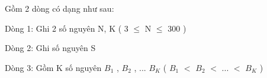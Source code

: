 Gồm 2 dòng có dạng như sau:

Dòng 1: Ghi 2 số nguyên N, K ( 3  $\le$  N  $\le$  300 )

Dòng 2: Ghi số nguyên S

Dòng 3: Gồm K số nguyên $B_{1}$ , $B_{2}$ , ... $B_{K}$ ( $B_{1}$ $<$ $B_{2}$ $<$ ... $<$ $B_{K}$ )